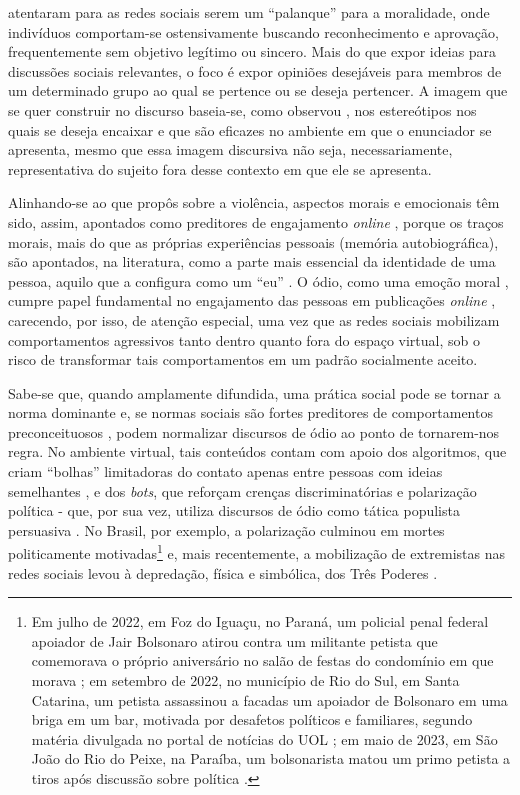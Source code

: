\documentclass[portuguese]{textolivre}
\begin{document}
\textcite{tosi2020grandstanding} atentaram para as redes sociais serem um “palanque” para a moralidade, onde indivíduos comportam-se ostensivamente buscando reconhecimento e aprovação, frequentemente sem objetivo legítimo ou sincero. Mais do que expor ideias para discussões sociais relevantes, o foco é expor opiniões desejáveis para membros de um determinado grupo ao qual se pertence ou se deseja pertencer. A imagem que se quer construir no discurso baseia-se, como observou \textcite{amossycharaudeua2008}, nos estereótipos nos quais se deseja encaixar e que são eficazes no ambiente em que o enunciador se apresenta, mesmo que essa imagem discursiva não seja, necessariamente, representativa do sujeito fora desse contexto em que ele se apresenta.

Alinhando-se ao que propôs \textcite{silvada2018ethos} sobre a violência, aspectos morais e emocionais têm sido, assim, apontados como preditores de engajamento \emph{online} \cite{brady2017emotion}, porque os traços morais, mais do que as próprias experiências pessoais (memória autobiográfica), são apontados, na literatura, como a parte mais essencial da identidade de uma pessoa, aquilo que a configura como um “eu” \cite{strohminger2014essential}. O ódio, como uma emoção moral \cite{smith2015teoria}, cumpre papel fundamental no engajamento das pessoas em publicações \textit{online} \cite{solovev2023moralized}, carecendo, por isso, de atenção especial, uma vez que as redes sociais mobilizam comportamentos agressivos tanto dentro quanto fora do espaço virtual, sob o risco de transformar tais comportamentos em um padrão socialmente aceito.

Sabe-se que, quando amplamente difundida, uma prática social pode se tornar a norma dominante \cite{bilewicz2020hate} e, se normas sociais são fortes preditores de comportamentos preconceituosos \cite{crandall2002social}, podem normalizar discursos de ódio ao ponto de tornarem-nos regra. No ambiente virtual, tais conteúdos contam com apoio dos algoritmos, que criam “bolhas” limitadoras do contato apenas entre pessoas com ideias semelhantes \cite{pariser2012}, e dos \emph{bots}, que reforçam crenças discriminatórias \cite{uyheng2022bots} e polarização política - que, por sua vez, utiliza discursos de ódio como tática populista persuasiva \cite{mercuri2020hate}. No Brasil, por exemplo, a polarização culminou em mortes politicamente motivadas\footnote{Em julho de 2022, em Foz do Iguaçu, no Paraná, um policial penal federal apoiador de Jair Bolsonaro atirou contra um militante petista que comemorava o próprio aniversário no salão de festas do condomínio em que morava \cite{azevedo2023}; em setembro de 2022, no município de Rio do Sul, em Santa Catarina, um petista assassinou a facadas um apoiador de Bolsonaro em uma briga em um bar, motivada por desafetos políticos e familiares, segundo matéria divulgada no portal de notícias do UOL \cite{estadao2022}; em maio de 2023, em São João do Rio do Peixe, na Paraíba, um bolsonarista matou um primo petista a tiros após discussão sobre política \cite{marzullo2023}.} \cite{pinho2022} e, mais recentemente, a mobilização de extremistas nas redes sociais levou à depredação, física e simbólica, dos Três Poderes \cite{guerra2023}.
\end{document}
